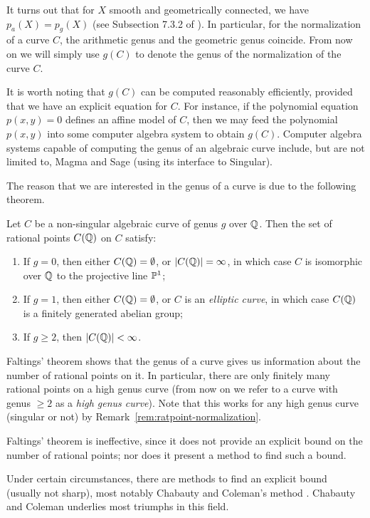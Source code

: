 It turns out that for $X$ smooth and geometrically connected, we have
$p_a(X) = p_g(X)$ (see Subsection 7.3.2 of \cite{MR1917232}). In
particular, for the normalization of a curve $C$, the arithmetic genus
and the geometric genus coincide. From now on we will simply use
$g(C)$ to denote the genus of the normalization of the curve $C$.

\begin{remark}
  It is worth noting that $g(C)$ can be computed reasonably
  efficiently, provided that we have an explicit equation for $C$. For
  instance, if the polynomial equation $p(x, y) = 0$ defines an affine
  model of $C$, then we may feed the polynomial $p(x, y)$ into some
  computer algebra system to obtain $g(C)$. Computer algebra systems
  capable of computing the genus of an algebraic curve include, but
  are not limited to, Magma and Sage (using its interface to
  Singular).
\end{remark}

The reason that we are interested in the genus of a curve is due to
the following theorem.

\begin{theorem}
  Let $C$ be a non-singular algebraic curve of genus $g$ over
  $\Q$. Then the set of rational points $C(\Q)$ on $C$ satisfy:
  \begin{enumerate}
  \item If $g = 0$, then either $C(\Q) = \es$, or $|C(\Q)| = \infty$,
    in which case $C$ is isomorphic over $\Q$ to the projective line
    $\P^1$;

  \item If $g = 1$, then either $C(\Q) = \es$, or $C$ is an
    \emph{elliptic curve}, in which case $C(\Q)$ is a finitely
    generated abelian group;

  \item If $g \ge 2$, then $|C(\Q)| < \infty$.
  \end{enumerate}
\end{theorem}

Faltings' theorem shows that the genus of a curve gives us information
about the number of rational points on it. In particular, there are
only finitely many rational points on a high genus curve (from now on
we refer to a curve with genus $\ge 2$ as a \emph{high genus
  curve}). Note that this works for any high genus curve (singular or
not) by Remark~\ref{rem:ratpoint-normalization}.

\begin{remark}
  Faltings' theorem is ineffective, since it does not provide an
  explicit bound on the number of rational points; nor does it present
  a method to find such a bound.

  Under certain circumstances, there are methods to find an explicit
  bound (usually not sharp), most notably Chabauty and Coleman's
  method \cite{MR808103}. Chabauty and Coleman underlies most triumphs
  in this field.
\end{remark}

